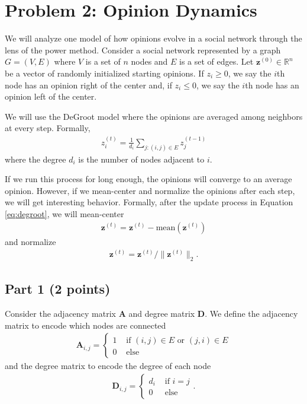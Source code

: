 \documentclass{article}
\begin{document}
\section*{Problem 2: Opinion Dynamics}

We will analyze one model of how opinions evolve in a social network through the lens of the power method.
Consider a social network represented by a graph $G = (V,E)$
where $V$ is a set of $n$ nodes and $E$ is a set of edges.
Let $\mathbf{z}^{(0)} \in \mathbb{R}^n$ be a vector of randomly initialized starting opinions.
If $z_i \geq 0$, we say the $i$th node has an opinion right of the center and, if $z_i \leq 0$, we say the $i$th node has an opinion left of the center.

We will use the DeGroot model where the opinions are averaged among neighbors at every step.
Formally,
\begin{align}\label{eq:degroot}
z^{(t)}_i = \frac1{d_i} \sum_{j: (i,j) \in E} z^{(t-1)}_j
\end{align}
where the degree $d_i$ is the number of nodes adjacent to $i$.

If we run this process for long enough, the opinions will converge to an average opinion.
However, if we mean-center and normalize the opinions after each step, we will get interesting behavior.
Formally, after the update process in Equation \ref{eq:degroot}, we will mean-center
\begin{align*}
\mathbf{z}^{(t)} = \mathbf{z}^{(t)} - \text{mean}(\mathbf{z}^{(t)})
\end{align*}
and normalize
\begin{align*}
\mathbf{z}^{(t)} = \mathbf{z}^{(t)} / \|\mathbf{z}^{(t)} \|_2.
\end{align*}

\subsection*{Part 1 (2 points)}
Consider the adjacency matrix $\mathbf{A}$ and degree matrix $\mathbf{D}$.
We define the adjacency matrix to encode which nodes are connected
\begin{align*}
\mathbf{A}_{i,j} = \begin{cases} 1 & \text{ if }(i,j) \in E \text{ or } (j,i) \in E\\ 0 & \text{ else }
\end{cases}
\end{align*}
and the degree matrix to encode the degree of each node
\begin{align*}
\mathbf{D}_{i,j} = \begin{cases} d_i & \text{ if } i = j \\ 0 & \text{ else }
\end{cases}.
\end{align*}
\end{document}
